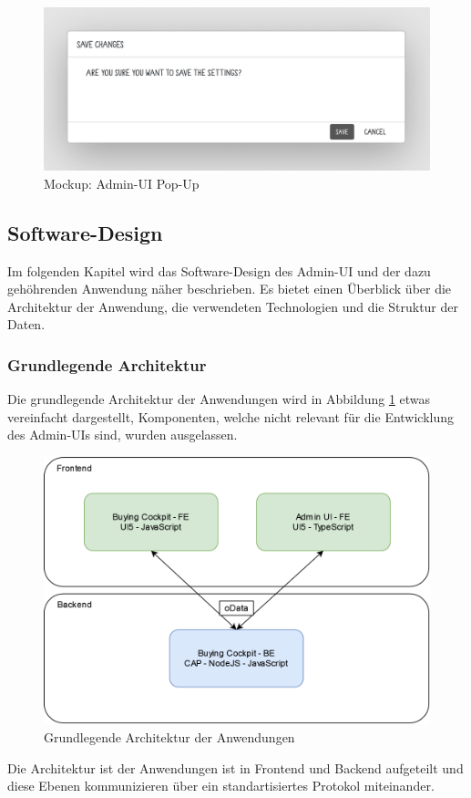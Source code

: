 \begin{figure}[H]
    \centering
    \includegraphics[width=\linewidth]{Images/Mockup_PopUp.png}
    \caption[Mockup: Admin-UI Pop-Up]{Mockup: Admin-UI Pop-Up}
\end{figure}

\subsection[Software-Design]{Software-Design}
Im folgenden Kapitel wird das Software-Design des Admin-UI und der dazu gehöhrenden Anwendung näher beschrieben.
Es bietet einen Überblick über die Architektur der Anwendung, die verwendeten Technologien und die Struktur der Daten.

\subsubsection[Grundlegende Architektur]{Grundlegende Architektur}
Die grundlegende Architektur der Anwendungen wird in Abbildung \ref{fig:architecture} etwas vereinfacht dargestellt, Komponenten, welche nicht relevant für die Entwicklung des Admin-UIs sind, wurden ausgelassen.

\begin{figure}[H]
    \centering
    \includegraphics[width=\linewidth]{Images/BE_Architecture.png}
    \caption[Grundlegende Architektur der Anwendungen]{Grundlegende Architektur der Anwendungen}
    \label{fig:architecture}
\end{figure}
Die Architektur ist der Anwendungen ist in Frontend und Backend aufgeteilt und diese Ebenen kommunizieren über ein standartisiertes Protokol miteinander.

